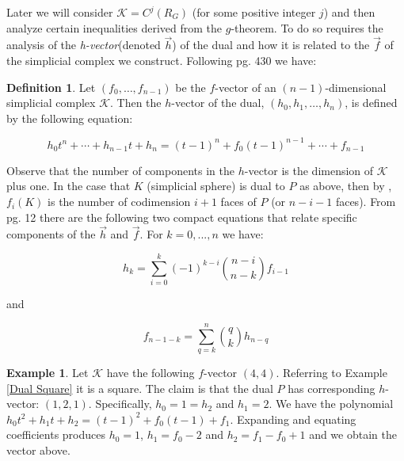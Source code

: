 \documentclass[oneside,12pt]{amsart}
\theoremstyle{definition}
\newtheorem{Definition}[Theorem]{Definition}
\newtheorem{Example}[Theorem]{Example}
\numberwithin{equation}{section}
\begin{document}
Later we will consider $\mathcal{K} = C^j(R_G)$ (for some positive integer $j$) and then analyze certain inequalities derived from the $g$-theorem.  To do so requires the analysis of the \textit{h-vector}(denoted $\overrightarrow{h}$) of the dual and how it is related to the $\overrightarrow{f}$ of the simplicial complex we construct.  Following \cite{DJ} pg. 430 we have:



\begin{Definition}
Let $(f_0,\ldots,f_{n-1})$ be the $f$-vector of an $(n-1)$-dimensional simplicial complex $\mathcal{K}$. Then the $h$-vector of the dual, $(h_0, h_1,\ldots,h_n)$, is defined by the following equation:

$$h_0t^n + \cdots+ h_{n-1}t + h_n  = (t-1)^n + f_0(t-1)^{n-1} + \cdots + f_{n-1}$$

\end{Definition}

Observe that the number of components in the $h$-vector is the dimension of $\mathcal{K}$ plus one.  In the case that $K$ (simplicial sphere) is dual to $P$ as above, then by \cite{DJ}, $f_i(K)$ is the number of codimension $i+1$ faces of $P$ (or $n-i-1$ faces). From \cite{BP1} pg. 12 there are the following two compact equations that relate specific components of the $\overrightarrow{h}$ and $\overrightarrow{f}$.  For $k = 0,...,n$
we have:\\

\begin{center}
$$h_k = \sum_{i = 0}^k (-1)^{k-i}\binom{n-i}{n-k}f_{i-1}$$
\end{center}

and
\begin{center}
$$f_{n-1-k} = \sum_{q = k}^n \binom{q}{k}h_{n-q}$$
\end{center}

\begin{Example}

Let $\mathcal{K}$ have the following $f$-vector  $(4,4)$.  Referring to Example \ref{Dual Square} it is a square.  The claim is that the dual $P$ has corresponding $h$-vector:  $(1,2,1)$.  Specifically, $h_0 =1 = h_2$ and $h_1 =2$.  We have the polynomial $h_0t^2 + h_1t+h_2 = (t-1)^2 + f_0(t-1) + f_1$.  Expanding and equating coefficients produces $h_0 =  1$, $h_1 = f_0 -2$ and $h_2 = f_1 - f_0 +1$ and we obtain the vector above.

\end{Example}
\end{document}
